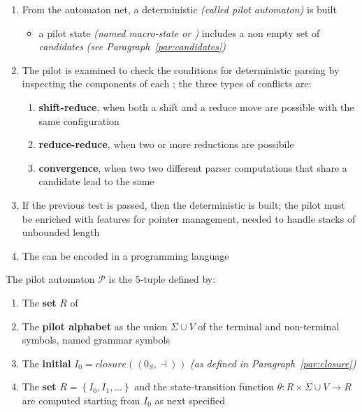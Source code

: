\documentclass[english]{article}
\begin{document}
\begin{enumerate}
  \item From the automaton net, a deterministic \FSA \textit{(called pilot automaton)} is built
        \begin{itemize}
          \item a pilot state \textit{(named macro-state or \mstate)} includes a non empty set of \textit{candidates} \textit{(see Paragraph~\ref{par:candidates})}
        \end{itemize}
  \item The pilot is examined to check the conditions for deterministic parsing by inspecting the components of each \mstate; the three types of conflicts are:
        \begin{enumerate}
          \item \textbf{shift-reduce}, when both a shift and a reduce move are possible with the same configuration
          \item \textbf{reduce-reduce}, when two or more reductions are possibile
          \item \textbf{convergence}, when two two different parser computations that share a candidate lead to the same \mstate
        \end{enumerate}
  \item If the previous test is passed, then the deterministic \PDA is built; the pilot \FSA must be enriched with features for pointer management, needed to handle stacks of unbounded length
  \item The \PDA can be encoded in a programming language
\end{enumerate}

\bigskip
The pilot automaton \(\mathcal{P}\) is the \(5\)-tuple defined by:

\begin{enumerate}
  \item The \textbf{set} \(R\) of \mstates
  \item The \textbf{pilot alphabet} as the union \(\Sigma \cup V\) of the terminal and non-terminal symbols, named grammar symbols
  \item The \textbf{initial \mstate} \(I_0 = \textit{closure}\left( \left\langle 0_S, \dashv \right\rangle \right)\) \textit{(as defined in Paragraph~\ref{par:closure})}
  \item The \textbf{\mstate set} \(R = \left\{ I_0, I_1, \ldots \right\}\) and the state-transition function \(\theta: R \times \Sigma \cup V \rightarrow R\) are computed starting from \(I_0\) as next specified
\end{enumerate}
\end{document}
